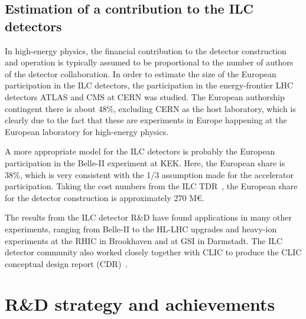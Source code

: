 \documentclass[%
 reprint,
 amsmath,amssymb,
 aps,
]{revtex4-1}
\begin{document}
\subsection{\label{Section:constructionmodel:ILCDet} Estimation of a
contribution to the ILC detectors}

In high-energy physics, the financial contribution to the detector
construction and operation
is typically assumed to be proportional to the number of authors of
the detector collaboration. In order to estimate the size of the
European participation in the ILC detectors,
the participation in the energy-frontier LHC detectors ATLAS and CMS at
CERN  was studied. The European
authorship contingent there is about 48\%, excluding CERN as the host
laboratory, which is clearly
due to the fact that these are  experiments in Europe happening at the
European laboratory for high-energy physics.

A more appropriate model for the ILC detectors is probably the European
participation in the Belle-II
experiment at KEK. Here, the European share is 38\%, which is very
consistent
with the 1/3 assumption made for the accelerator participation. Taking
the cost numbers from
the ILC TDR~\cite{ILC-TDR}, the European share for the detector
construction is approximately 270 M\euro{}.


The results from the ILC detector R\&D have found applications in many other experiments, ranging from Belle-II to the \acs{HL-LHC} upgrades and heavy-ion experiments at the \ac{RHIC} in Brookhaven and at \acs{GSI} in Darmstadt. The ILC detector community also worked closely together with CLIC to produce the CLIC conceptual design report (CDR)~\cite{CLIC_CDR-DET}.

\section{\label{sec:RandD}R\&D strategy and achievements}
\end{document}
